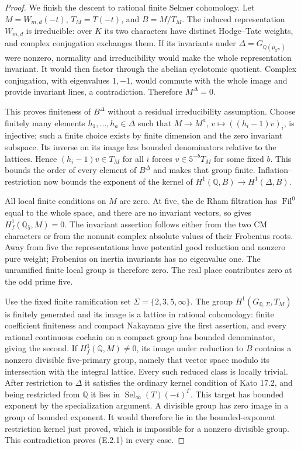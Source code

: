 \begin{proof}
We finish the descent to rational finite Selmer cohomology.
Let \(M=W_{m,d}(-t)\), \(T_M=T(-t)\), and \(B=M/T_M\).
The induced representation \(W_{m,d}\) is irreducible:
over \(K\) its two characters have distinct Hodge--Tate
weights, and complex conjugation exchanges them. If its
invariants under \(\Delta=G_{\mathbb Q(\mu_{5^\infty})}\)
were nonzero, normality and irreducibility would make the
whole representation invariant. It would then factor
through the abelian cyclotomic quotient. Complex
conjugation, with eigenvalues \(1,-1\), would commute
with the whole image and provide invariant lines, a
contradiction. Therefore \(M^\Delta=0\).

This proves finiteness of \(B^\Delta\) without a residual
irreducibility assumption. Choose finitely many elements
\(h_1,\ldots,h_a\in\Delta\) such that
\(M\to M^a\), \(v\mapsto((h_i-1)v)_i\), is injective;
such a finite choice exists by finite dimension and the
zero invariant subspace. Its inverse on its image has
bounded denominators relative to the lattices. Hence
\((h_i-1)v\in T_M\) for all \(i\) forces
\(v\in5^{-b}T_M\) for some fixed \(b\).
This bounds the order of every element of \(B^\Delta\)
and makes that group finite. Inflation--restriction now
bounds the exponent of the kernel of
\(H^1(\mathbb Q,B)\to H^1(\Delta,B)\).

All local finite conditions on \(M\) are zero. At five,
the de Rham filtration has \(\operatorname{Fil}^0\)
equal to the whole space, and there are no invariant
vectors, so \cite[Corollary 3.8.4]{DE_BlochKato1990}
gives \(H_f^1(\mathbb Q_5,M)=0\). The invariant assertion
follows either from the two CM characters or from the
nonunit complex absolute values of their Frobenius
roots. Away from five the representations have potential
good reduction and nonzero pure weight; Frobenius on
inertia invariants has no eigenvalue one. The unramified
finite local group is therefore zero. The real place
contributes zero at the odd prime five.

Use the fixed finite ramification set
\(\Sigma=\{2,3,5,\infty\}\). The group
\(H^1(G_{\mathbb Q,\Sigma},T_M)\) is finitely generated
and its image is a lattice in rational cohomology: finite
coefficient finiteness and compact Nakayama give the
first assertion, and every rational continuous cochain
on a compact group has bounded denominator, giving the
second. If \(H_f^1(\mathbb Q,M)\ne0\), its image under
reduction to \(B\) contains a nonzero divisible
five-primary group, namely that vector space modulo
its intersection with the integral lattice.
Every such reduced class is locally trivial. After
restriction to \(\Delta\) it satisfies the ordinary
kernel condition of Kato 17.2, and being restricted
from \(\mathbb Q\) it lies in
\(\operatorname{Sel}_\infty(T)(-t)^{\Gamma}\).
This target has bounded exponent by the specialization
argument. A divisible group has zero image in a group
of bounded exponent. It would therefore lie in the
bounded-exponent restriction kernel just proved, which
is impossible for a nonzero divisible group.
This contradiction proves (E.2.1) in every case.
\end{proof}

